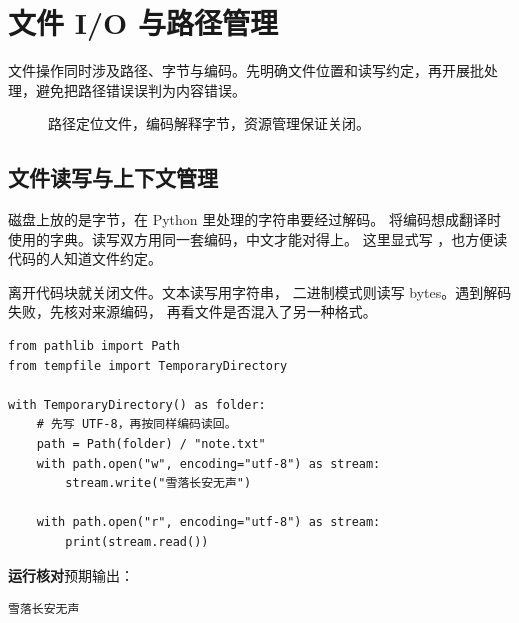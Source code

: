 \chapter{文件 I/O 与路径管理}
\label{ch:09-outline}

文件操作同时涉及路径、字节与编码。先明确文件位置和读写约定，再开展批处理，避免把路径错误误判为内容错误。


\begin{figure}[htbp]
  \centering
  \caption*{路径定位文件，编码解释字节，资源管理保证关闭。}
\end{figure}


\section{文件读写与上下文管理}

磁盘上放的是字节，在 Python 里处理的字符串要经过解码。
将编码想成翻译时使用的字典。读写双方用同一套编码，中文才能对得上。
这里显式写 ，也方便读代码的人知道文件约定。

 离开代码块就关闭文件。文本读写用字符串，
二进制模式则读写 bytes。遇到解码失败，先核对来源编码，
再看文件是否混入了另一种格式。


\begin{lstlisting}[title={\code{utf8_roundtrip.py}}]
from pathlib import Path
from tempfile import TemporaryDirectory

with TemporaryDirectory() as folder:
    # 先写 UTF-8，再按同样编码读回。
    path = Path(folder) / "note.txt"
    with path.open("w", encoding="utf-8") as stream:
        stream.write("雪落长安无声")

    with path.open("r", encoding="utf-8") as stream:
        print(stream.read())
\end{lstlisting}


\textbf{运行核对}\enspace 预期输出：
\begin{lstlisting}[language={},numbers=none]
雪落长安无声
\end{lstlisting}

